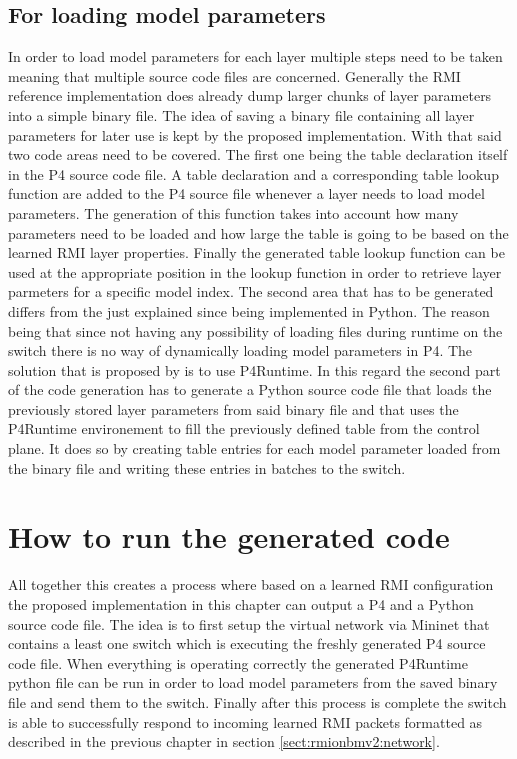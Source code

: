 \subsection{For loading model parameters}
\label{sect:rmiforp4:parameters}
In order to load model parameters for each layer multiple steps need to be taken meaning that multiple source code files are concerned. Generally the RMI reference implementation does already dump larger chunks of layer parameters into a simple binary file. The idea of saving a binary file containing all layer parameters for later use is kept by the proposed implementation. With that said two code areas need to be covered. The first one being the table declaration itself in the P4 source code file. A table declaration and a corresponding table lookup function are added to the P4 source file whenever a layer needs to load model parameters. The generation of this function takes into account how many parameters need to be loaded and how large the table is going to be based on the learned RMI layer properties. Finally the generated table lookup function can be used at the appropriate position in the lookup function in order to retrieve layer parmeters for a specific model index. The second area that has to be generated differs from the just explained since being implemented in Python. The reason being that since not having any possibility of loading files during runtime on the switch there is no way of dynamically loading model parameters in P4. The solution that is proposed by \cite{p4runtime-spec} is to use P4Runtime. In this regard the second part of the code generation has to generate a Python source code file that loads the previously stored layer parameters from said binary file and that uses the P4Runtime environement to fill the previously defined table from the control plane. It does so by creating table entries for each model parameter loaded from the binary file and writing these entries in batches to the switch.

\section{How to run the generated code}
All together this creates a process where based on a learned RMI configuration the proposed implementation in this chapter can output a P4 and a Python source code file. The idea is to first setup the virtual network via Mininet that contains a least one switch which is executing the freshly generated P4 source code file. When everything is operating correctly the generated P4Runtime python file can be run in order to load model parameters from the saved binary file and send them to the switch. Finally after this process is complete the switch is able to successfully respond to incoming learned RMI packets formatted as described in the previous chapter in section \ref{sect:rmionbmv2:network}.

